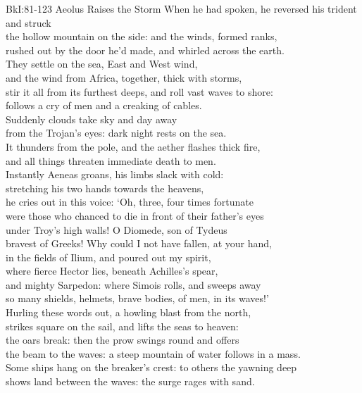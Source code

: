 \documentclass[12pt, a5paper]{letter}
\begin{document}
{BkI:81-123 Aeolus Raises the Storm}
When he had spoken, he reversed his trident and struck\\
the hollow mountain on the side: and the winds, formed ranks,\\
rushed out by the door he'd made, and whirled across the earth.\\
They settle on the sea, East and West wind,\\
and the wind from Africa, together, thick with storms,\\
stir it all from its furthest deeps, and roll vast waves to shore:\\
follows a cry of men and a creaking of cables.\\
Suddenly clouds take sky and day away\\
from the Trojan's eyes: dark night rests on the sea.\\
It thunders from the pole, and the aether flashes thick fire,\\
and all things threaten immediate death to men.\\
Instantly Aeneas groans, his limbs slack with cold:\\
stretching his two hands towards the heavens,\\
he cries out in this voice: `Oh, three, four times fortunate\\
were those who chanced to die in front of their father's eyes\\
under Troy's high walls! O Diomede, son of Tydeus\\
bravest of Greeks! Why could I not have fallen, at your hand,\\
in the fields of Ilium, and poured out my spirit,\\
where fierce Hector lies, beneath Achilles's spear,\\
and mighty Sarpedon: where Simois rolls, and sweeps away\\
so many shields, helmets, brave bodies, of men, in its waves!'\\
Hurling these words out, a howling blast from the north,\\
strikes square on the sail, and lifts the seas to heaven:\\
the oars break: then the prow swings round and offers\\
the beam to the waves: a steep mountain of water follows in a mass.\\
Some ships hang on the breaker's crest: to others the yawning deep\\
shows land between the waves: the surge rages with sand.\\
\end{document}
